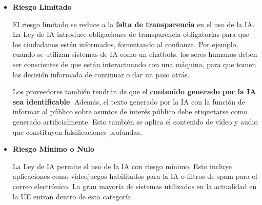 \begin{itemize}
	\item \textbf{Riesgo Limitado}
	
	El riesgo limitado se reduce a la \textbf{falta de transparencia} en el uso de la IA. La Ley de IA introduce obligaciones de transparencia obligatorias para que los ciudadanos estén informados, fomentando al confianza. Por ejemplo, cuando se utilizan sistemas de IA como un chatbots, los seres humanos deben ser conscientes de que están interactuando con una máquina, para que tomen las decisión informada de continuar o dar un paso atrás.
	
	Los proveedores también tendrán de que el \textbf{contenido generado por la IA sea identificable}. Además, el texto generado por la IA con la función de informar al público sobre asuntos de interés público debe etiquetarse como generado artificialmente. Esto también se aplica el contenido de vídeo y audio que constituyen falsificaciones profundas.
	
	\item \textbf{Riesgo Mínimo o Nulo}
	
	La Ley de IA permite el uso de la IA con riesgo mínimo. Esto incluye aplicaciones como videojuegos habilitados para la IA o filtros de spam para el correo electrónico. La gran mayoría de sistemas utilizados en la actualidad en la UE entran dentro de esta categoría. 
\end{itemize}




\newpage
 
\printglossary	

\newpage





 